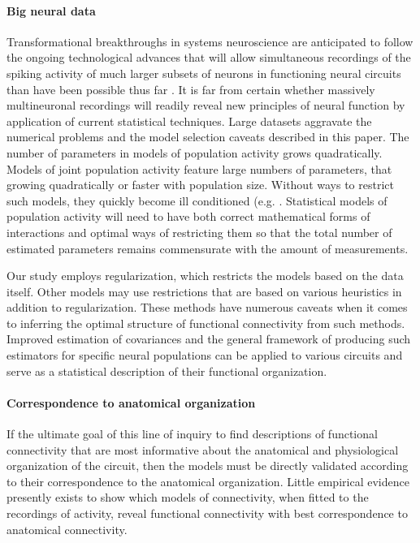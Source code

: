 \documentclass[10pt]{article}
\begin{document}
\paragraph{Big neural data}
Transformational breakthroughs in systems neuroscience are anticipated to follow the ongoing technological advances that will allow simultaneous recordings of the spiking activity of much larger subsets of neurons in functioning neural circuits than have been possible thus far \cite{Alivisatos:2013}. It is far from certain whether massively multineuronal recordings will readily reveal new principles of neural function by application of current statistical techniques. Large datasets aggravate the numerical problems and the model selection caveats described in this paper. The number of parameters in models of population activity grows quadratically.  Models of joint population activity feature large numbers of parameters, that growing quadratically or faster with population size. Without ways to restrict such models, they quickly become ill conditioned (e.g. \cite{Roudi:2009}.  Statistical models of population activity will need to have both correct mathematical forms of interactions and optimal ways of restricting them so that the total number of estimated parameters remains commensurate with the amount of measurements. 

Our study employs regularization, which restricts the models based on the data itself. Other models may use restrictions that are based on various heuristics in addition to regularization.  These methods have numerous caveats when it comes to inferring the optimal structure of functional connectivity from such methods. Improved estimation of covariances and the general framework of producing such estimators for specific neural populations can be applied to various circuits and serve as a statistical description of their functional organization. 

\paragraph{Correspondence to anatomical organization}
If the ultimate goal of this line of inquiry to find descriptions of functional connectivity that are most informative about the anatomical and physiological organization of the circuit, then the models must be directly validated according to their correspondence to the anatomical organization. Little empirical evidence presently exists to show which models of connectivity, when fitted to the recordings of activity, reveal functional connectivity with best correspondence to anatomical connectivity. 
\end{document}
